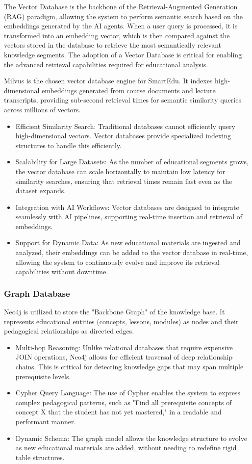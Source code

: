 The Vector Database is the backbone of the Retrieval-Augmented Generation (RAG) paradigm, allowing the system to perform semantic search based on the embeddings generated by the AI agents. When a user query is processed, it is transformed into an embedding vector, which is then compared against the vectors stored in the database to retrieve the most semantically relevant knowledge segments.
The adoption of a Vector Database is critical for enabling the advanced retrieval capabilities required for educational analysis.

Milvus is the chosen vector database engine for SmartEdu. It indexes high-dimensional embeddings generated from course documents and lecture transcripts, providing sub-second retrieval times for semantic similarity queries across millions of vectors.
\begin{itemize}
    \item Efficient Similarity Search: Traditional databases cannot efficiently query high-dimensional vectors. Vector databases provide specialized indexing structures to handle this efficiently.
    \item Scalability for Large Datasets: As the number of educational segments grows, the vector database can scale horizontally to maintain low latency for similarity searches, ensuring that retrieval times remain fast even as the dataset expands.
    \item Integration with AI Workflows: Vector databases are designed to integrate seamlessly with AI pipelines, supporting real-time insertion and retrieval of embeddings.
    \item Support for Dynamic Data: As new educational materials are ingested and analyzed, their embeddings can be added to the vector database in real-time, allowing the system to continuously evolve and improve its retrieval capabilities without downtime.
\end{itemize}

\subsubsection*{Graph Database}
Neo4j is utilized to store the "Backbone Graph" of the knowledge base. It represents educational entities (concepts, lessons, modules) as nodes and their pedagogical relationships as directed edges. 
\begin{itemize}
    \item Multi-hop Reasoning: Unlike relational databases that require expensive JOIN operations, Neo4j allows for efficient traversal of deep relationship chains. This is critical for detecting knowledge gaps that may span multiple prerequisite levels.
    \item Cypher Query Language: The use of Cypher enables the system to express complex pedagogical patterns, such as "Find all prerequisite concepts of concept X that the student has not yet mastered," in a readable and performant manner.
    \item Dynamic Schema: The graph model allows the knowledge structure to evolve as new educational materials are added, without needing to redefine rigid table structures.
\end{itemize}

